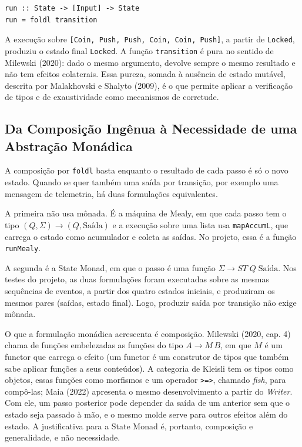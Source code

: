 \documentclass[12pt,a4paper]{article}
\begin{document}
\begin{verbatim}
run :: State -> [Input] -> State
run = foldl transition
\end{verbatim}

A execução sobre \texttt{[Coin, Push, Push, Coin, Coin, Push]}, a partir de \texttt{Locked}, produziu o estado final \texttt{Locked}. A função \texttt{transition} é pura no sentido de Milewski (2020): dado o mesmo argumento, devolve sempre o mesmo resultado e não tem efeitos colaterais. Essa pureza, somada à ausência de estado mutável, descrita por Malakhovski e Shalyto (2009), é o que permite aplicar a verificação de tipos e de exaustividade como mecanismos de corretude.

\subsection{Da Composição Ingênua à Necessidade de uma Abstração Monádica}

A composição por \texttt{foldl} basta enquanto o resultado de cada passo é só o novo estado. Quando se quer também uma saída por transição, por exemplo uma mensagem de telemetria, há duas formulações equivalentes.

A primeira não usa mônada. É a máquina de Mealy, em que cada passo tem o tipo $(Q, \Sigma) \to (Q, \text{Saída})$ e a execução sobre uma lista usa \texttt{mapAccumL}, que carrega o estado como acumulador e coleta as saídas. No projeto, essa é a função \texttt{runMealy}.

A segunda é a State Monad, em que o passo é uma função $\Sigma \to ST\;Q\;\text{Saída}$. Nos testes do projeto, as duas formulações foram executadas sobre as mesmas sequências de eventos, a partir dos quatro estados iniciais, e produziram os mesmos pares (saídas, estado final). Logo, produzir saída por transição não exige mônada.

O que a formulação monádica acrescenta é composição. Milewski (2020, cap. 4) chama de funções embelezadas as funções do tipo $A \to M\,B$, em que $M$ é um functor que carrega o efeito (um functor é um construtor de tipos que também sabe aplicar funções a seus conteúdos). A categoria de Kleisli tem os tipos como objetos, essas funções como morfismos e um operador \texttt{>=>}, chamado \textit{fish}, para compô-las; Maia (2022) apresenta o mesmo desenvolvimento a partir do \textit{Writer}. Com ele, um passo posterior pode depender da saída de um anterior sem que o estado seja passado à mão, e o mesmo molde serve para outros efeitos além do estado. A justificativa para a State Monad é, portanto, composição e generalidade, e não necessidade.
\end{document}
